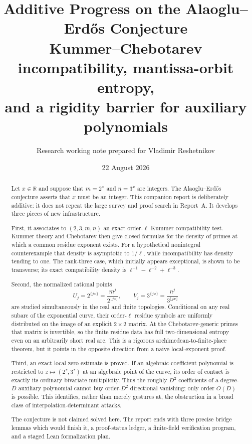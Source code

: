 \documentclass[11pt,oneside]{article}
\title{\textbf{Additive Progress on the Alaoglu--Erd\H{o}s Conjecture}\\[0.4em]
\large Kummer--Chebotarev incompatibility, mantissa-orbit entropy,\\
and a rigidity barrier for auxiliary polynomials}
\author{Research working note prepared for Vladimir Reshetnikov}
\date{22 August 2026}
\theoremstyle{definition}
\theoremstyle{remark}
\newcommand{\R}{\mathbb{R}}
\begin{document}
\maketitle

\begin{abstract}
Let $x\in\R$ and suppose that $m=2^x$ and $n=3^x$ are integers.  The
Alaoglu--Erd\H{o}s conjecture asserts that $x$ must be an integer.  This
companion report is deliberately additive: it does not repeat the large
survey and proof search in Report~A.  It develops three pieces of new
infrastructure.

First, it associates to $(2,3,m,n)$ an exact order-$\ell$ Kummer
compatibility test.  Kummer theory and Chebotarev then give closed formulas
for the density of primes at which a common residue exponent exists.  For a
hypothetical nonintegral counterexample that density is asymptotic to
$1/\ell$, while incompatibility has density tending to one.  The rank-three
case, which initially appears exceptional, is shown to be transverse; its
exact compatibility density is
$\ell^{-1}-\ell^{-2}+\ell^{-3}$.

Second, the normalized rational points
\[
 U_j=2^{\{jx\}}=\frac{m^j}{2^{\lfloor jx\rfloor}},\qquad
 V_j=3^{\{jx\}}=\frac{n^j}{3^{\lfloor jx\rfloor}}
\]
are studied simultaneously in the real and finite topologies.  Conditional
on any real subarc of the exponential curve, their order-$\ell$ residue
symbols are uniformly distributed on the image of an explicit $2\times2$
matrix.  At the Chebotarev-generic primes that matrix is invertible, so the
finite residue data has full two-dimensional entropy even on an arbitrarily
short real arc.  This is a rigorous archimedean-to-finite-place theorem, but
it points in the opposite direction from a naive local-exponent proof.

Third, an exact local zero estimate is proved.  If an algebraic-coefficient
polynomial is restricted to $z\mapsto(2^z,3^z)$ at an algebraic point of the
curve, its order of contact is exactly its ordinary bivariate multiplicity.
Thus the roughly $D^2$ coefficients of a degree-$D$ auxiliary polynomial
cannot buy order-$D^2$ directional vanishing; only order $O(D)$ is possible.
This identifies, rather than merely gestures at, the obstruction in a broad
class of interpolation-determinant attacks.

The conjecture is not claimed solved here.  The report ends with three
precise bridge lemmas which would finish it, a proof-status ledger, a
finite-field verification program, and a staged Lean formalization plan.
\end{abstract}
\end{document}
